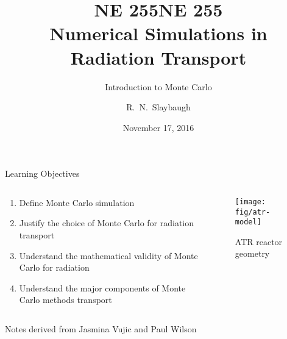 \documentclass[xcolor=x11names,compress]{beamer}
\title{NE 255}
\author{R.\ N.\ Slaybaugh}
\date{November 17, 2016}
\renewcommand{\(}{\begin{columns}}
\renewcommand{\)}{\end{columns}}
\newcommand{\<}[1]{\begin{column}{#1}}
\renewcommand{\>}{\end{column}}
\begin{document}
\begin{frame}
\title{NE 255\\Numerical Simulations in Radiation Transport}
\subtitle{Introduction to Monte Carlo}
\titlepage
\end{frame}

\begin{frame}{Learning Objectives}

\begin{columns}
  \begin{column}{0.5\textwidth}
    \begin{enumerate}
    \item Define Monte Carlo simulation
    \item Justify the choice of Monte Carlo for radiation transport
    \item Understand the mathematical validity of Monte Carlo for radiation
    \item Understand the major components of Monte Carlo methods transport
    \end{enumerate}
  \end{column}
  \begin{column}{0.5\textwidth}
  	\begin{figure}
  	\begin{center}
  		\texttt{[image: fig/atr-model]}
  		\caption{ATR reactor geometry}
	\end{center}
  	\end{figure}
  \end{column}
\end{columns}

Notes derived from Jasmina Vujic and Paul Wilson
\end{frame}

\end{document}
